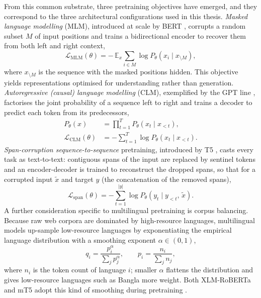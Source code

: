 From this common substrate, three pretraining objectives have emerged, and they correspond to the three architectural configurations used in this thesis. \emph{Masked language modelling} (MLM), introduced at scale by BERT \cite{devlin2019bert}, corrupts a random subset $M$ of input positions and trains a bidirectional encoder to recover them from both left and right context,
\begin{equation}
\label{eq:mlm}
\mathcal{L}_{\mathrm{MLM}}(\theta) = -\,\mathbb{E}_{x}\sum_{i\in M}\log P_\theta\!\left(x_i \mid x_{\setminus M}\right),
\end{equation}
where $x_{\setminus M}$ is the sequence with the masked positions hidden. This objective yields representations optimised for understanding rather than generation. \emph{Autoregressive (causal) language modelling} (CLM), exemplified by the GPT line \cite{radford2019gpt2}, factorises the joint probability of a sequence left to right and trains a decoder to predict each token from its predecessors,
\begin{equation}
\label{eq:clm}
\begin{aligned}
P_\theta(x) &= \prod_{t=1}^{T} P_\theta\!\left(x_t \mid x_{<t}\right), \\
\mathcal{L}_{\mathrm{CLM}}(\theta) &= -\sum_{t=1}^{T}\log P_\theta\!\left(x_t \mid x_{<t}\right).
\end{aligned}
\end{equation}
\emph{Span-corruption sequence-to-sequence} pretraining, introduced by T5 \cite{raffel2020t5}, casts every task as text-to-text: contiguous spans of the input are replaced by sentinel tokens and an encoder-decoder is trained to reconstruct the dropped spans, so that for a corrupted input $\tilde{x}$ and target $y$ (the concatenation of the removed spans),
\begin{equation}
\label{eq:span}
\mathcal{L}_{\mathrm{span}}(\theta) = -\sum_{t=1}^{|y|}\log P_\theta\!\left(y_t \mid y_{<t},\, \tilde{x}\right).
\end{equation}
A further consideration specific to multilingual pretraining is corpus balancing. Because raw web corpora are dominated by high-resource languages, multilingual models up-sample low-resource languages by exponentiating the empirical language distribution with a smoothing exponent $\alpha\in(0,1)$,
\begin{equation}
\label{eq:smoothing}
q_i = \frac{p_i^{\alpha}}{\sum_j p_j^{\alpha}},
\qquad
p_i = \frac{n_i}{\sum_j n_j},
\end{equation}
where $n_i$ is the token count of language $i$; smaller $\alpha$ flattens the distribution and gives low-resource languages such as Bangla more weight. Both XLM-RoBERTa and mT5 adopt this kind of smoothing during pretraining \cite{conneau2020xlmr,xue2021mt5}.

